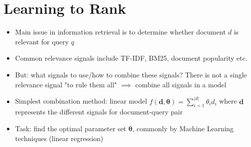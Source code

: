 \section{Learning to Rank}
\begin{itemize}
	\item Main issue in information retrieval is to determine whether document $d$ is relevant for query $q$
	\item Common relevance signals include TF-IDF, BM25, document popularity etc.
	\item But: what signals to use/how to combine these signals? There is not a single relevance signal "to rule them all" $\implies$ combine all signals in a model
	\item Simplest combination method: linear model $f(\bm{d},\bm{\theta}) = \sum\limits_{i=1}^{|d|} \theta_i d_i$ where $\bm{d}$ represents the different signals for document-query pair
	\item Task: find the optimal parameter set $\bm{\theta}$, commonly by Machine Learning techniques (linear regression)
\end{itemize}
